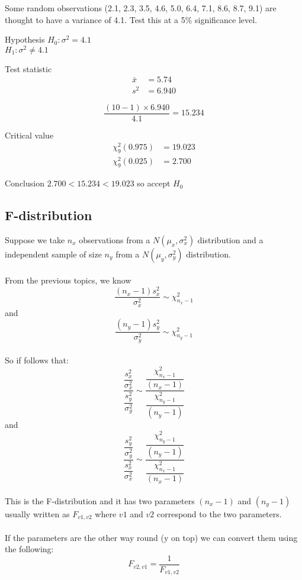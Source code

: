         \begin{example}
        {
            Some random observations (2.1, 2.3, 3.5, 4.6, 5.0, 6.4, 7.1, 8.6, 8.7, 9.1) are thought to have a variance of 4.1. Test this at a 5\% significance level.
        }
        
        \begin{step}{Hypothesis}
        $H_0: \sigma^2 = 4.1$\\
        $H_1: \sigma^2 \ne 4.1$
        \end{step}

        \begin{step}{Test statistic}
        \begin{align*} 
        \bar{x} &= 5.74 \\ 
        s^2 &= 6.940 
        \end{align*} 

        $$\frac{(10 - 1) \times 6.940}{4.1} = 15.234$$
        \end{step}

        \begin{step}{Critical value}
        \begin{align*} 
        \chi^2_9(0.975) &= 19.023\\ 
        \chi^2_9(0.025) &= 2.700
        \end{align*}
        \end{step}

        \begin{step}{Conclusion}
        $2.700 < 15.234 < 19.023$ so accept $H_0$
        \end{step}

        \end{example}


    \subsection{F-distribution}
        Suppose we take $n_x$ observations from a $N(\mu_x, \sigma_x^2)$ distribution and a independent sample of size $n_y$ from a $N(\mu_y, \sigma_y^2)$ distribution.\\
        \\
        From the previous topics, we know $$\frac{(n_x-1)s_x^2}{\sigma_x^2} \sim \chi^2_{n_x-1}$$ and $$\frac{(n_y-1)s_y^2}{\sigma_y^2} \sim \chi^2_{n_y-1}$$
        \\
        So if follows that: 
        $$
        \dfrac{\dfrac{s_x^2}{\sigma_x^2}}{\dfrac{s_y^2}{\sigma_y^2}} 
        \sim 
        \dfrac{\dfrac{\chi^2_{n_x-1}}{(n_x-1)}}{\dfrac{\chi^2_{n_y-1}}{(n_y-1)}}
        $$ 
        and 
        $$ 
        \dfrac{\dfrac{s_y^2}{\sigma_y^2}}{\dfrac{s_x^2}{\sigma_x^2}} 
        \sim 
        \dfrac{\dfrac{\chi^2_{n_y-1}}{(n_y-1)}}{\dfrac{\chi^2_{n_x-1}}{(n_x-1)}} 
        $$
        \\
        This is the F-distribution and it has two parameters $(n_x - 1)$ and $(n_y - 1)$ usually written as $F_{v1, v2}$ where $v1$ and $v2$ correspond to the two parameters.\\
        \\
        If the parameters are the other way round (y on top) we can convert them using the following: 
        $$ F_{v2, v1} = \frac{1}{F_{v1, v2}} $$

